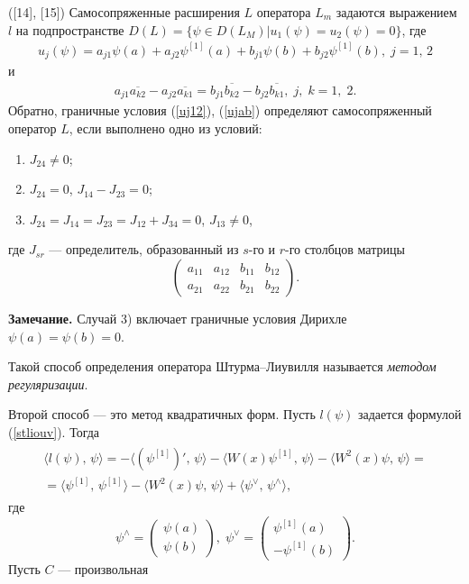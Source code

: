 \documentclass[a4paper
]{article}
\begin{document}
\begin{Trm}
\label{method_regul}
{\rm ([14], [15])}
Самосопряженные расширения $L$ оператора $L_m$ задаются выражением
$l$ на подпространстве $D(L)=\{\psi\in D(L_M)|u_1(\psi)=u_2(\psi)=0\}$,
где
\begin{align}
\label{uj12}
u_j(\psi)=a_{j1}\psi(a)+a_{j2}\psi^{[1]}(a)+b_{j1}\psi(b)+
b_{j2}\psi^{[1]}(b), \; j=1, \, 2
\end{align}
и
\begin{align}
\label{ujab}
a_{j1}\overline{a_{k2}}-a_{j2}\overline{a_{k1}}=b_{j1}\overline{b_{k2}}-
b_{j2}\overline{b_{k1}}, \; j, \; k=1, \; 2.
\end{align}
Обратно, граничные условия (\ref{uj12}), (\ref{ujab}) определяют
самосопряженный оператор $L$, если выполнено одно из условий:
\begin{enumerate}
\item $J_{24}\ne 0$;
\item $J_{24}=0$, $J_{14}-J_{23}=0$;
\item $J_{24}=J_{14}=J_{23}=J_{12}+J_{34}=0$, $J_{13}\ne 0$,
\end{enumerate}
где $J_{sr}$ --- определитель, образованный из $s$-го и $r$-го столбцов
матрицы $$\begin{pmatrix} a_{11} & a_{12} & b_{11} & b_{12} \\
a_{21} & a_{22} & b_{21} & b_{22}\end{pmatrix}.$$
\end{Trm}
{\bf Замечание.} Случай 3) включает граничные условия Дирихле $\psi(a)=
\psi(b)=0$. \par
Такой способ определения оператора Штурма--Лиувилля называется {\it методом
регуляризации}. \par
Второй способ --- это метод квадратичных форм. Пусть $l(\psi)$ задается
формулой (\ref{stliouv}). Тогда
\begin{align}
\label{quad_form_method}
\begin{array}{c}
\langle l(\psi), \, \psi\rangle =-\langle (\psi^{[1]})',\, \psi\rangle
-\langle W(x)\psi^{[1]}, \, \psi
\rangle -\langle W^2(x)\psi , \, \psi\rangle = \\ =\langle \psi ^{[1]}, \,
\psi ^{[1]}\rangle -\langle W^2(x)\psi , \, \psi\rangle +\langle \psi^{\vee},
\, \psi ^{\wedge}\rangle,
\end{array}
\end{align}
где $$\psi^{\wedge}=\begin{pmatrix}
\psi(a) \\ \psi(b) \end{pmatrix}, \; \psi^{\vee}=\begin{pmatrix}
\psi^{[1]}(a) \\ -\psi^{[1]}(b) \end{pmatrix}.$$ Пусть $C$ --- произвольная
\end{document}

